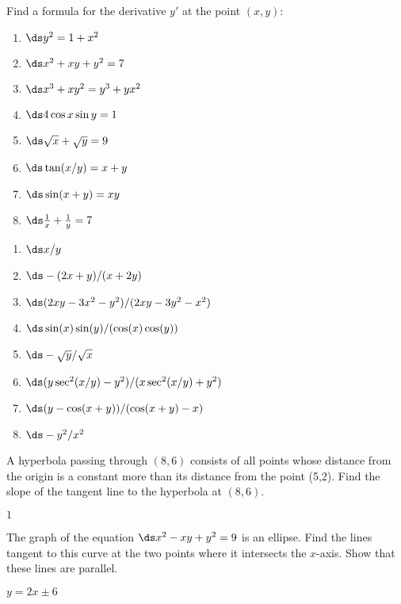 \begin{enumialphparenastyle}

\begin{ex} 
Find a formula for the derivative $y'$ at the point $(x,y)$:
\begin{multicols}{2}
\begin{enumerate}
	\item	$\ds y^2=1+x^2$
	\item	$\ds x^2+xy+y^2=7$
	\item	$\ds x^3+xy^2=y^3+yx^2$
	\item	$\ds 4\cos x \sin y = 1$
	\item	$\ds\sqrt{x} + \sqrt{y} = 9$
	\item	$\ds \tan(x/y) = x+ y$
	\item	$\ds \sin (x+y ) =xy$
	\item	$\ds\frac{1}{x} + \frac{1}{y} = 7$
\end{enumerate}
\end{multicols}
\begin{sol}
\begin{enumerate}
	\item	$\ds x/y$
	\item	$\ds -(2x+y)/(x+2y)$
	\item	$\ds (2xy-3x^2-y^2)/(2xy-3y^2-x^2)$
	\item	$\ds \sin(x)\sin(y)/(\cos(x)\cos(y))$
	\item	$\ds-\sqrt{y}/\sqrt{x}$
	\item	$\ds (y\sec^2(x/y)-y^2)/(x\sec^2(x/y)+y^2)$
	\item	$\ds (y-\cos(x+y))/(\cos(x+y)-x)$
	\item	$\ds -y^2/x^2$
\end{enumerate}
\end{sol}
\end{ex}

\begin{ex} 
A hyperbola passing through $(8,6)$ consists of all points whose distance
from the origin is a constant more than its distance from the point (5,2).
Find the slope of the tangent line to the hyperbola at $(8,6)$.
\begin{sol}
	$1$
\end{sol}
\end{ex}

\begin{ex} 
The graph of the equation $\ds x^2 - xy + y^2 = 9$ is an ellipse.
Find the lines tangent to this curve at the two
 points where it intersects the $x$-axis. Show that these lines are
 parallel.
\begin{sol}
	$y=2x\pm6$
\end{sol}
\end{ex}


\end{enumialphparenastyle}
